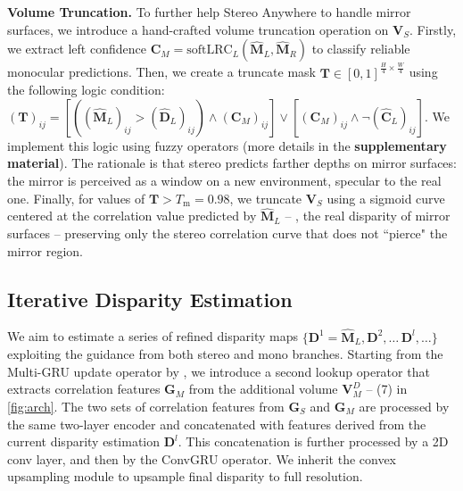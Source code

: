 \documentclass[10pt,twocolumn,letterpaper]{article}
\newcommand{\method}[0]{Stereo Anywhere\xspace}
\begin{document}
\textbf{Volume Truncation.} To further help \method to handle mirror surfaces, we introduce a hand-crafted volume truncation operation on ${\mathbf{V}}_S$. Firstly, we extract left confidence $\mathbf{C}_M=\text{softLRC}_L(\hat{\mathbf{M}}_L, \hat{\mathbf{M}}_R)$ to classify reliable monocular predictions. Then, we create a truncate mask $\mathbf{T} \in [0,1]^{\frac{H}{4} \times \frac{W}{4}}$ using the following logic condition: $(\mathbf{T})_{ij}=\left[\left((\hat{\mathbf{M}}_L)_{ij} >(\hat{\mathbf{D}}_L)_{ij}\right) \land (\mathbf{C}_M)_{ij} \right] \lor \left[ (\mathbf{C}_M)_{ij} \land \neg(\hat{\mathbf{C}}_L)_{ij} \right]$.
We implement this logic using fuzzy operators (more details in the \textbf{supplementary material}).
The rationale is that stereo predicts farther depths on mirror surfaces: the mirror is perceived as a window on a new environment, specular to the real one.
Finally, for values of $\mathbf{T}>T_\text{m}=0.98$, we truncate ${\mathbf{V}_S}$ using a sigmoid curve centered at the correlation value predicted by $\hat{\mathbf{M}}_L$ -- \ie, the real disparity of mirror surfaces -- preserving only the stereo correlation curve that does not ``pierce" the mirror region.


\phantom{Invisible Text}
\vspace{-\baselineskip}

\subsection{Iterative Disparity Estimation}


We aim to estimate a series of refined disparity maps $\{\mathbf{D}^1=\hat{\mathbf{M}}_L, \mathbf{D}^2,\dots\,\mathbf{D}^l,\dots\}$ exploiting the guidance from both stereo and mono branches.
Starting from the Multi-GRU update operator by \cite{lipson2021raft}, we introduce a second lookup operator that extracts correlation features $\mathbf{G}_M$ from the additional volume $\mathbf{V}^D_M$ -- (7) in \cref{fig:arch}.
The two sets of correlation features from $\mathbf{G}_S$ and $\mathbf{G}_M$ are processed by the same two-layer encoder and concatenated with features derived from the current disparity estimation $\mathbf{D}^l$. This concatenation is further processed by a 2D conv layer, and then by the ConvGRU operator.
We inherit the convex upsampling module \cite{lipson2021raft} to upsample final disparity to full resolution.


\phantom{Invisible Text}
\vspace{-\baselineskip}
\end{document}
